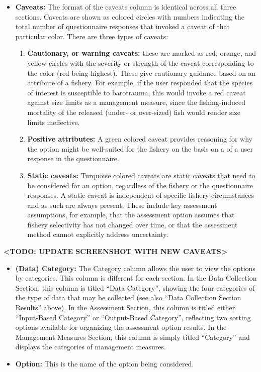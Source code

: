 \documentclass[11pt,]{book}
\providecommand{\tightlist}{%
  \setlength{\itemsep}{0pt}\setlength{\parskip}{0pt}}
\begin{document}
\begin{itemize}
\item
  \textbf{Caveats:} The format of the caveats column is identical across
  all three sections. Caveats are shown as colored circles with numbers
  indicating the total number of questionnaire responses that invoked a
  caveat of that particular color. There are three types of caveats:

  \begin{enumerate}
  \def\labelenumi{\arabic{enumi}.}
  \tightlist
  \item
    \textbf{Cautionary, or warning caveats:} these are marked as red,
    orange, and yellow circles with the severity or strength of the
    caveat corresponding to the color (red being highest). These give
    cautionary guidance based on an attribute of a fishery. For example,
    if the user responded that the species of interest is susceptible to
    barotrauma, this would invoke a red caveat against size limits as a
    management measure, since the fishing-induced mortality of the
    released (under- or over-sized) fish would render size limits
    ineffective.
  \item
    \textbf{Positive attributes:} A green colored caveat provides
    reasoning for why the option might be well-suited for the fishery on
    the basis on a of a user response in the questionnaire.
  \item
    \textbf{Static caveats:} Turquoise colored caveats are static
    caveats that need to be considered for an option, regardless of the
    fishery or the questionnaire responses. A static caveat is
    independent of specific fishery circumstances and as such are always
    present. These include key assessment assumptions, for example, that
    the assessment option assumes that fishery selectivity has not
    changed over time, or that the assessment method cannot explicitly
    address uncertainty.
  \end{enumerate}
\end{itemize}

\textbf{\textless TODO: UPDATE SCREENSHOT WITH NEW
CAVEATS\textgreater{}}

\begin{itemize}
\item
  \textbf{(Data) Category:} The Category column allows the user to view
  the options by categories. This column is different for each section.
  In the Data Collection Section, this column is titled ``Data
  Category'', showing the four categories of the type of data that may
  be collected (see also ``Data Collection Section Results'' above). In
  the Assessment Section, this column is titled either ``Input-Based
  Category'' or ``Output-Based Category'', reflecting two sorting
  options available for organizing the assessment option results. In the
  Management Measures Section, this column is simply titled ``Category''
  and displays the categories of management measures.
\item
  \textbf{Option:} This is the name of the option being considered.
\end{itemize}
\end{document}
